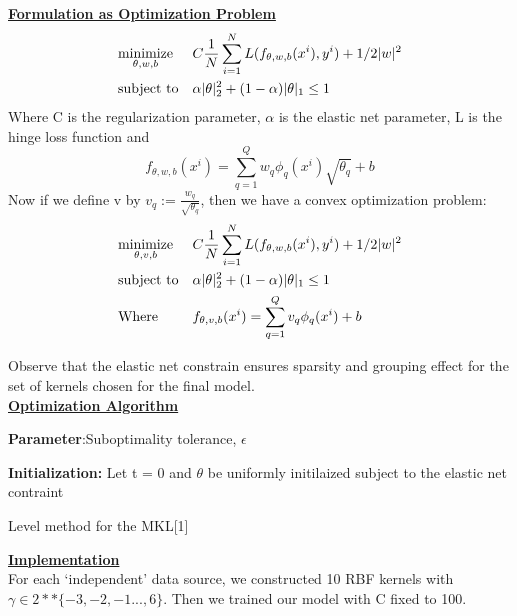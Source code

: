 \documentclass[8pts]{paper}
\begin{document}
\underline{\textbf{Formulation as Optimization Problem}}
\begin{align*}
&\text{$\underset{\theta, w, b}{\text{minimize}}$} & &C  \frac{1}{N} \sum_{i=1}^{N} L(f_{\theta, w, b}(x^i), y^i) + 1/2 |w|^2 \\
&\text{subject to} & &\alpha|\theta|_2^2 + (1-\alpha){|\theta|_1} \leq 1\\
\end{align*}
Where C is the regularization parameter, $\alpha$ is the elastic net parameter, L is the hinge loss function and $$f_{\theta, w, b}(x^i) = \sum_{q=1}^{Q} w_q \phi_q(x^i) \sqrt{\theta_q} + b $$
Now if we define v by $v_q := \frac{w_q}{\sqrt{\theta_q}}$, then we have a convex optimization problem:
\begin{align*}
&\text{$\underset{\theta, v, b}{\text{minimize}}$} & &C  \frac{1}{N} \sum_{i=1}^{N} L(f_{\theta, w, b}(x^i), y^i) + 1/2 |w|^2 \\
&\text{subject to} & &\alpha|\theta|_2^2 + (1-\alpha){|\theta|_1} \leq 1\\
&\text{Where}  & &f_{\theta, v, b}(x^i) = \sum_{q=1}^{Q} v_q \phi_q(x^i)  + b
\end{align*}

Observe that the elastic net constrain ensures sparsity and grouping effect for the set of kernels chosen for the final model.\\

\underline{\textbf{Optimization Algorithm}}

\begin{algorithm}[H]
 \textbf{Parameter}:Suboptimality tolerance, $\epsilon$

 \textbf{Initialization:} Let t = 0 and $\theta$ be uniformly initilaized subject to the elastic net contraint\\
 \caption{Level method for the MKL[1]}
\end{algorithm}

\vspace{10 mm}
\underline{\textbf{Implementation}}\\
For each `independent' data source, we constructed 10 RBF kernels with $\gamma \in 2**\{-3, -2, -1 ..., 6\}$. Then we trained our model with C fixed to 100. \\
\end{document}
